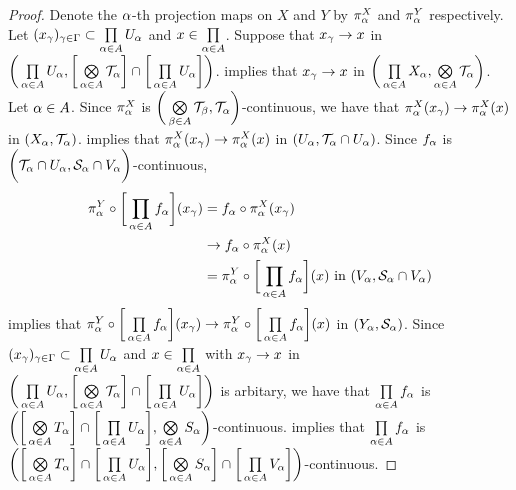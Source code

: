 \documentclass{book}
\begin{document}
	\begin{proof}
		Denote the $\alpha$-th projection maps on $X$ and $Y$ by $\pi^X_{\alpha}$ and $\pi^Y_{\alpha}$ respectively. Let $(x_{\gamma})_{\gamma \in \Gamma} \subset \prod\limits_{\alpha \in A} U_{\alpha}$ and $x \in \prod\limits_{\alpha \in A}$. Suppose that $x_{\gamma} \rightarrow x$ in $\bigg( \prod\limits_{\alpha \in A} U_{\alpha} , \bigg[ \bigotimes\limits_{\alpha \in A} \mathcal{T}_{\alpha} \bigg] \cap \bigg[ \prod\limits_{\alpha \in A} U_{\alpha} \bigg] \bigg)$.  implies that $x_{\gamma} \rightarrow x$ in $\bigg( \prod\limits_{\alpha \in A} X_{\alpha}, \bigotimes\limits_{\alpha \in A} \mathcal{T}_{\alpha}  \bigg)$. Let $\alpha \in A$. Since $\pi^X_{\alpha}$ is $\bigg(\bigotimes\limits_{\beta \in A} \mathcal{T}_{\beta}, \mathcal{T}_{\alpha} \bigg)$-continuous, we have that $\pi^X_{\alpha}(x_{\gamma}) \rightarrow \pi^X_{\alpha}(x)$ in $(X_{\alpha}, \mathcal{T}_{\alpha})$.  implies that $\pi^X_{\alpha}(x_{\gamma}) \rightarrow \pi^X_{\alpha}(x)$ in $(U_{\alpha}, \mathcal{T}_{\alpha} \cap U_{\alpha})$. Since $f_{\alpha}$ is $\bigg(\mathcal{T}_{\alpha} \cap U_{\alpha}, \mathcal{S}_{\alpha} \cap V_{\alpha} \bigg)$-continuous, 
		\begin{align*}
			\pi^Y_{\alpha} \circ \bigg[ \prod\limits_{\alpha \in A}f_{\alpha} \bigg] (x_{\gamma})
			& = f_{\alpha} \circ \pi^X_{\alpha}(x_{\gamma}) \\
			& \rightarrow f_{\alpha} \circ \pi^X_{\alpha}(x) \\
			& = \pi^Y_{\alpha} \circ \bigg[ \prod\limits_{\alpha \in A}f_{\alpha} \bigg] (x)  \text{ in $(V_{\alpha}, \mathcal{S}_{\alpha} \cap V_{\alpha})$} 
		\end{align*}
		 implies that $\pi^Y_{\alpha} \circ \bigg[ \prod\limits_{\alpha \in A}f_{\alpha} \bigg] (x_{\gamma}) \rightarrow \pi^Y_{\alpha} \circ \bigg[ \prod\limits_{\alpha \in A}f_{\alpha} \bigg] (x) $ in $(Y_{\alpha}, \mathcal{S}_{\alpha})$. Since $(x_{\gamma})_{\gamma \in \Gamma} \subset \prod\limits_{\alpha \in A} U_{\alpha}$ and $x \in \prod\limits_{\alpha \in A}$ with $x_{\gamma} \rightarrow x$ in $\bigg( \prod\limits_{\alpha \in A} U_{\alpha} , \bigg[ \bigotimes\limits_{\alpha \in A} \mathcal{T}_{\alpha} \bigg] \cap \bigg[ \prod\limits_{\alpha \in A} U_{\alpha} \bigg] \bigg)$ is arbitary, we have that $\prod\limits_{\alpha \in A}f_{\alpha}$ is $\bigg( \bigg[ \bigotimes\limits_{\alpha \in A} T_{\alpha} \bigg]  \cap \bigg[ \prod\limits_{\alpha \in A} U_{\alpha} \bigg], \bigotimes\limits_{\alpha \in A} S_{\alpha} \bigg)$-continuous.  implies that $\prod\limits_{\alpha \in A}f_{\alpha}$ is $\bigg( \bigg[ \bigotimes\limits_{\alpha \in A} T_{\alpha} \bigg]  \cap \bigg[ \prod\limits_{\alpha \in A} U_{\alpha} \bigg], \bigg[ \bigotimes\limits_{\alpha \in A} S_{\alpha} \bigg] \cap \bigg[ \prod\limits_{\alpha \in A} V_{\alpha} \bigg] \bigg)$-continuous.
	\end{proof}
\end{document}
